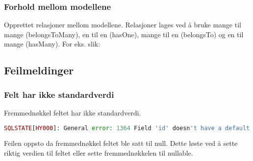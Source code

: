 

\subsubsection{Forhold mellom modellene}
Opprettet relasjoner mellom modellene. 
Relasjoner lages ved å bruke mange til mange (belongsToMany), en til en (hasOne), mange til en (belongsTo) og en til mange (hasMany). For eks. slik:


\subsection{Feilmeldinger}
\subsubsection{Felt har ikke standardverdi}
Fremmednøkkel feltet har ikke standardverdi.
\begin{lstlisting}[language=PHP]
    SQLSTATE[HY000]: General error: 1364 Field 'id' doesn't have a default value (SQL: insert into `fields` (`name`, `slug`, `updated_at`, `created_at`) values (HELLO WORLD, hello_world, 2019-02-06 08:57:48, 2019-02-06 08:57:48))
\end{lstlisting}
Feilen oppsto da fremmednøkkel feltet ble satt til null. Dette løste ved å sette riktig verdien til feltet eller sette fremmednøkkelen til nullable. 

